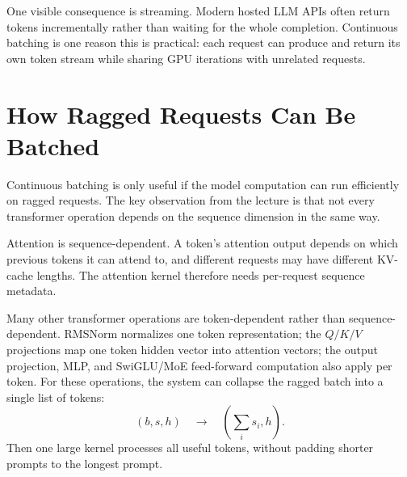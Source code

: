 \documentclass[11pt]{article}
\begin{document}
One visible consequence is streaming.  Modern hosted LLM APIs often return tokens incrementally rather than waiting for the whole completion.  Continuous batching is one reason this is practical: each request can produce and return its own token stream while sharing GPU iterations with unrelated requests.

\section{How Ragged Requests Can Be Batched}

Continuous batching is only useful if the model computation can run efficiently on ragged requests.  The key observation from the lecture is that not every transformer operation depends on the sequence dimension in the same way.

Attention is sequence-dependent.  A token's attention output depends on which previous tokens it can attend to, and different requests may have different KV-cache lengths.  The attention kernel therefore needs per-request sequence metadata.

Many other transformer operations are token-dependent rather than sequence-dependent.  RMSNorm normalizes one token representation; the \(Q/K/V\) projections map one token hidden vector into attention vectors; the output projection, MLP, and SwiGLU/MoE feed-forward computation also apply per token.  For these operations, the system can collapse the ragged batch into a single list of tokens:
\[
  (b, s, h) \quad \longrightarrow \quad
  \left(\sum_i s_i, h\right).
\]
Then one large kernel processes all useful tokens, without padding shorter prompts to the longest prompt.
\end{document}

